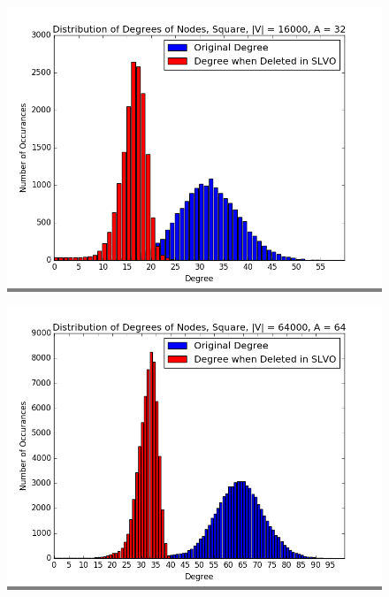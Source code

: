 \documentclass{article}
\begin{document}
\begin{figure}
\begin{minipage}{0.3\textwidth}
    \colorbox{gray}{\includegraphics[width=\linewidth]{./graphs/hist_deg_del_square_2.png}}
    \end{minipage}
    \vskip 0.1in
    \begin{minipage}{0.3\textwidth}
    \colorbox{gray}{\includegraphics[width=\linewidth]{./graphs/hist_deg_del_square_3.png}}
    \end{minipage}
    \hspace{\fill}
    \begin{minipage}{0.3\textwidth}

\end{minipage}
\end{figure}
\end{document}
